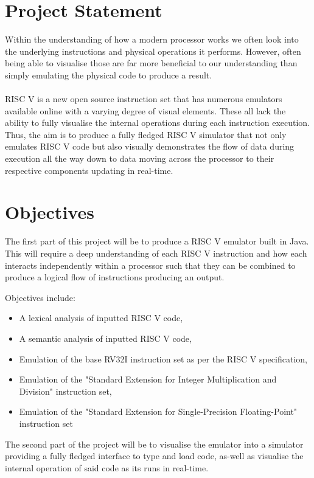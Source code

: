\documentclass[a4paper,fleqn,12pt]{article}
\begin{document}


\pagestyle{plain}

\section{Project Statement}
Within the understanding of how a modern processor works we often look into the underlying instructions and physical operations it performs. However, often being able to visualise
those are far more beneficial to our understanding than simply emulating the physical code to produce a result.
\\\\
RISC V is a new open source instruction set that has numerous emulators available online with a varying degree of visual elements.
These all lack the ability to fully visualise the internal operations during each instruction execution. Thus, the aim is to produce a fully fledged RISC V simulator that not only emulates RISC V code but also visually demonstrates the flow of data during execution all the way down to data moving across the processor to their respective components updating in real-time.

\section{Objectives}
The first part of this project will be to produce a RISC V emulator built in Java. This will require a deep understanding of each RISC V instruction and how each interacts independently within a processor such that they can be combined to produce a logical flow of instructions producing an output.

Objectives include:
\begin{itemize}
    \item A lexical analysis of inputted RISC V code,
    \item A semantic analysis of inputted RISC V code,
    \item Emulation of the base RV32I instruction set \cite{risc_spec} as per the RISC V specification,
    \item Emulation of the "Standard Extension for Integer Multiplication and Division" instruction set,
    \item Emulation of the "Standard Extension for Single-Precision Floating-Point" instruction set
\end{itemize}

The second part of the project will be to visualise the emulator into a simulator providing a fully fledged interface to type and load code, as-well as visualise the internal operation of said code as its runs in real-time.
\end{document}
